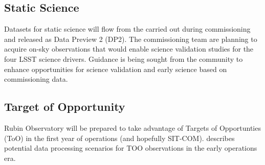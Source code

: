 \subsection{Static Science}
 
Datasets for static science will flow from the \svs carried out during commissioning and released as Data Preview 2 (DP2). 
The commissioning team are planning to acquire on-sky observations that would enable science validation studies for the four LSST science drivers.
Guidance is being sought from the community to enhance opportunities for science validation and early science  based on commissioning data.

\subsection{Target of Opportunity}

Rubin Observatory will be prepared to take advantage of Targets of Opportunties (ToO) in the first year of operations (and hopefully SIT-COM). 
 describes potential data processing scenarios for TOO observations in the early operations era.